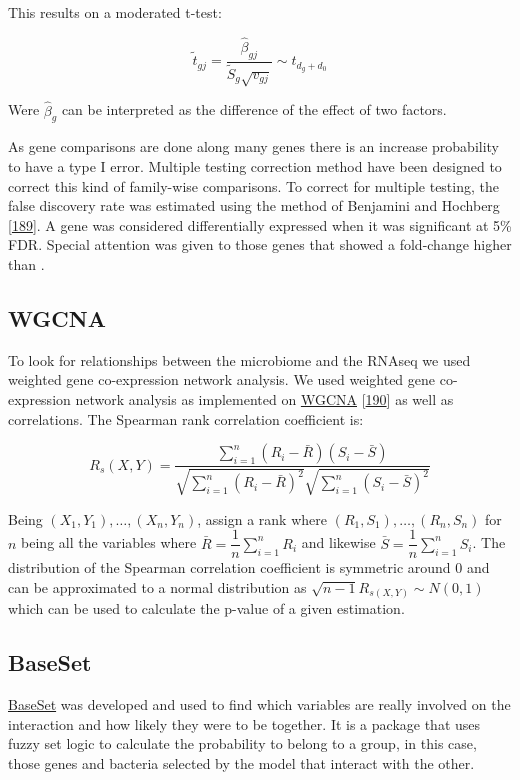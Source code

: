 \documentclass[
  12pt,
  a4paper,
  twoside,
  openright]{book}
\begin{document}
This results on a moderated t-test:

\[
\widetilde t_{gj} = \dfrac{\hat \beta_{gj}}{\tilde S_g \sqrt{v_{gj}}} \sim t_{d_g + d_0}
\]

Were \(\hat \beta_g\) can be interpreted as the difference of the effect of two factors.

As gene comparisons are done along many genes there is an increase probability to have a type I error.
Multiple testing correction method have been designed to correct this kind of family-wise comparisons.
To correct for multiple testing, the false discovery rate was estimated using the method of Benjamini and Hochberg {[}\protect\hyperlink{ref-yoavbenjamini}{189}{]}.
A gene was considered differentially expressed when it was significant at 5\% FDR.
Special attention was given to those genes that showed a fold-change higher than \textbar.

\hypertarget{wgcna}{%
\subsection{WGCNA}\label{wgcna}}

To look for relationships between the microbiome and the RNAseq we used weighted gene co-expression network analysis.
We used weighted gene co-expression network analysis as implemented on \href{https://cran.r-project.org/package=WGCNA}{WGCNA} {[}\protect\hyperlink{ref-langfelder2008}{190}{]} as well as correlations.
The Spearman rank correlation coefficient is:

\[
R_s(X,Y) = \dfrac{\sum_{i=1}^n (R_i - \bar{R}) (S_i - \bar{S} )}{\sqrt{\sum_{i=1}^n (R_i - \bar{R})^2}\sqrt{\sum_{i=1}^n (S_i - \bar{S})^2}}
\]

Being \((X_1 , Y_1 ),\dots, (X_n , Y_n)\), assign a rank where \((R_1 , S_1 ), \dots , (R_n , S_n )\) for \(n\) being all the variables where \(\bar{R}=\dfrac{1}{n}\sum_{i=1}^n R_i\) and likewise \(\bar{S}=\dfrac{1}{n}\sum_{i=1}^n S_i\).
The distribution of the Spearman correlation coefficient is symmetric around 0 and can be approximated to a normal distribution as \(\sqrt{n-1}R_{s(X,Y)} \sim N(0,1)\) which can be used to calculate the p-value of a given estimation.

\hypertarget{baseset}{%
\subsection{BaseSet}\label{baseset}}

\href{https://cran.r-project.org/package=BaseSet}{BaseSet} was developed and used to find which variables are really involved on the interaction and how likely they were to be together.
It is a package that uses fuzzy set logic to calculate the probability to belong to a group, in this case, those genes and bacteria selected by the model that interact with the other.
\end{document}
